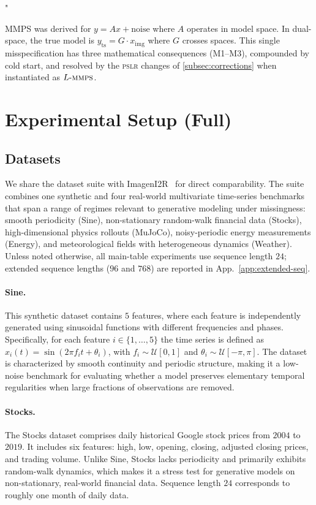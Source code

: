 "\documentclass{article}
\theoremstyle{plain}
\theoremstyle{definition}
\theoremstyle{remark}
\newcommand{\pslr}{\textsc{pslr}}
\newcommand{\lmmps}{L\mbox{-}\textsc{mmps}}
\newcommand{\yts}{y_{\mathrm{ts}}}
\newcommand{\ximg}{x_{\mathrm{img}}}
\begin{document}
MMPS was derived for $y = Ax + \mathrm{noise}$ where $A$ operates in model space. In dual-space, the true model is $\yts = G \cdot \ximg$ where $G$ crosses spaces. This single misspecification has three mathematical consequences (M1--M3), compounded by cold start, and resolved by the \pslr{} changes of \cref{subsec:corrections} when instantiated as $\lmmps$.

\section{Experimental Setup (Full)}
\label{app:setup-full}

\subsection{Datasets}
\label{app:datasets}

We share the dataset suite with ImagenI2R~\citep{fadlon2025imageni2r} for direct comparability. The suite combines one synthetic and four real-world multivariate time-series benchmarks that span a range of regimes relevant to generative modeling under missingness: smooth periodicity (Sine), non-stationary random-walk financial data (Stocks), high-dimensional physics rollouts (MuJoCo), noisy-periodic energy measurements (Energy), and meteorological fields with heterogeneous dynamics (Weather). Unless noted otherwise, all main-table experiments use sequence length $24$; extended sequence lengths ($96$ and $768$) are reported in App.~\ref{app:extended-seq}.

\paragraph{Sine.}
This synthetic dataset contains $5$ features, where each feature is independently generated using sinusoidal functions with different frequencies and phases. Specifically, for each feature $i \in \{1, \ldots, 5\}$ the time series is defined as $x_i(t) = \sin(2\pi f_i t + \theta_i)$, with $f_i \sim \mathcal{U}[0, 1]$ and $\theta_i \sim \mathcal{U}[-\pi, \pi]$. The dataset is characterized by smooth continuity and periodic structure, making it a low-noise benchmark for evaluating whether a model preserves elementary temporal regularities when large fractions of observations are removed.

\paragraph{Stocks.}
The Stocks dataset comprises daily historical Google stock prices from $2004$ to $2019$. It includes six features: high, low, opening, closing, adjusted closing prices, and trading volume. Unlike Sine, Stocks lacks periodicity and primarily exhibits random-walk dynamics, which makes it a stress test for generative models on non-stationary, real-world financial data. Sequence length $24$ corresponds to roughly one month of daily data.
\end{document}
